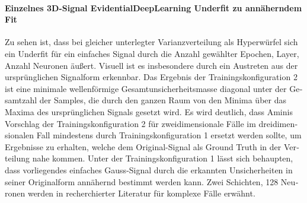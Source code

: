 \begin{otherlanguage}{ngerman}
\paragraph{Einzelnes 3D-Signal \gls{EvidentialDeepLearning} Underfit zu annäherndem Fit} Zu sehen ist, dass bei gleicher unterlegter Varianzverteilung als Hyperwürfel sich ein Underfit für ein einfaches Signal durch die Anzahl gewählter Epochen, Layer, Anzahl Neuronen äußert. Visuell ist es insbesondere durch ein Austreten aus der ursprünglichen Signalform erkennbar. Das Ergebnis der Trainingskonfiguration 2 ist eine minimale wellenförmige Gesamtunsicherheitsmasse diagonal unter der Gesamtzahl der Samples, die durch den ganzen Raum von den Minima über das Maxima des ursprünglichen Signals gesetzt wird. Es wird deutlich, dass Aminis Vorschlag der Trainingskonfiguration 2 für zweidimensionale Fälle im dreidimensionalen Fall mindestens durch Trainingskonfiguration 1 ersetzt werden sollte, um Ergebnisse zu erhalten, welche dem Original-Signal als Ground Truth in der Verteilung nahe kommen. Unter der Trainingskonfiguration 1 lässt sich behaupten, dass vorliegendes einfaches Gauss-Signal durch die erkannten Unsicherheiten in seiner Originalform annähernd bestimmt werden kann. Zwei Schichten, 128 Neuronen werden in recherchierter Literatur für komplexe Fälle erwähnt. %



\end{otherlanguage}
